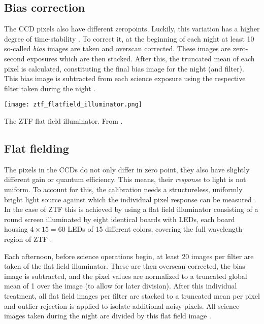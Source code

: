 \subsection{Bias correction}
The CCD pixels also have different zeropoints. Luckily, this variation has a higher degree of time-stability . To correct it, at the beginning of each night at least 10 so-called \textit{bias} images are taken and overscan corrected. These images are zero-second exposures which are then stacked. After this, the truncated mean of each pixel is calculated, constituting the final bias image for the night (and filter). This bias image is subtracted from each science exposure using the respective filter taken during the night \cite{Masci2019a}.

\begin{marginfigure}
    \texttt{[image: ztf\_flatfield\_illuminator.png]}
    \caption[ZTF flat field illuminator]{The ZTF flat field illuminator. From \cite{Dekany2020}.}
\end{marginfigure}

\subsection{Flat fielding}

The pixels in the CCDs do not only differ in zero point, they also have slightly different gain or quantum efficiency. This means, their \textit{response} to light is not uniform. To account for this, the calibration needs a structureless, uniformly bright light source against which the individual pixel response can be measured \cite{Howell2006}. In the case of ZTF this is achieved by using a flat field illuminator consisting of a round screen illuminated by eight identical boards with LEDs, each board housing $4\times15=60$ LEDs of 15 different colors, covering the full wavelength region of ZTF \cite{Dekany2020}.

Each afternoon, before science operations begin, at least 20 images per filter are taken of the flat field illuminator. These are then overscan corrected, the bias image is subtracted, and the pixel values are normalized to a truncated global mean of 1 over the image (to allow for later division). After this individual treatment, all flat field images per filter are stacked to a truncated mean per pixel and outlier rejection is applied to isolate additional noisy pixels. All science images taken during the night are divided by this flat field image \cite{Masci2019a}.

